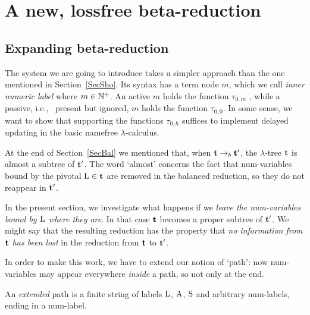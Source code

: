 \documentclass[submission,copyright,creativecommons]{eptcs}
\begin{document}


\section{A new, lossfree beta-reduction}\label{SecNewLos}
\label{SecLos}

\subsection{Expanding beta-reduction}\label{SecExp}

The system we are going to introduce takes a simpler approach than the one mentioned in Section~\ref{SecSho}.
Its syntax has a term node $m$, which we call {\em inner numeric label\/}
where $m \in \mathbb{N}^+$.
An active $m$ holds the function $\tau_{0,m}$
, while a passive, i.e., \ present but ignored, $m$ holds the function $\tau_{0,0}$.
In some sense, we want to show that supporting the functions $\tau_{0,h}$
suffices to implement delayed updating in the basic namefree $\lambda$-calculus. 

\medskip

At the end of Section~\ref{SecBal} we mentioned that, when ${\bf t} \rightarrow_b {\bf t}'$, the $\lambda$-tree ${\bf t}$ is almost a subtree of ${\bf t}'$. The word `almost' concerns the fact that num-variables bound by the pivotal ${\rm L} \in {\bf t}$ are removed in the balanced reduction, so they do not reappear in ${\bf t}'$.

In the present section, we investigate what happens if we {\it leave the num-variables bound by ${\rm L}$ where they are}. In that case ${\bf t}$ becomes a proper subtree of ${\bf t}'$. We might say that the resulting reduction has the property that {\it no information from ${\bf t}$ has been lost\/} in the reduction from ${\bf t}$ to ${\bf t}'$.

\smallskip

In order to make this work, we have to extend our notion of `path': now num-variables may appear everywhere {\it inside\/} a path, so not only at the end.

\begin{Def}
An {\em extended\/} path is a finite string of labels ${\rm L}$,  ${\rm A}$, ${\rm S}$ and arbitrary num-labels, ending in a num-label.
\end{Def}
\end{document}

